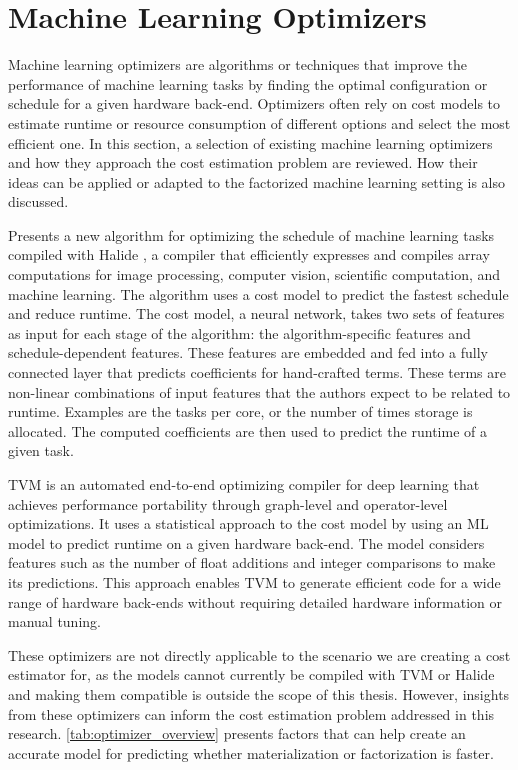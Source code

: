 \section{Machine Learning Optimizers}
\label{sec:3-ml-optimizers}
Machine learning optimizers are algorithms or techniques that improve the performance of machine learning tasks by finding the optimal configuration or schedule for a given hardware back-end. Optimizers often rely on cost models to estimate runtime or resource consumption of different options and select the most efficient one. In this section, a selection of existing machine learning optimizers and how they approach the cost estimation problem are reviewed. How their ideas can be applied or adapted to the factorized machine learning setting is also discussed.

\cite{halide_cost_model} Presents a new algorithm for optimizing the schedule of machine learning tasks compiled with Halide \cite{halide_cost_model}, a compiler that efficiently expresses and compiles array computations for image processing, computer vision, scientific computation, and machine learning. The algorithm uses a cost model to predict the fastest schedule and reduce runtime. The cost model, a neural network, takes two sets of features as input for each stage of the algorithm: the algorithm-specific features and schedule-dependent features. These features are embedded and fed into a fully connected layer that predicts coefficients for hand-crafted terms. These terms are non-linear combinations of input features that the authors expect to be related to runtime. Examples are the tasks per core, or the number of times storage is allocated. The computed coefficients are then used to predict the runtime of a given task.

TVM \cite{tvm} is an automated end-to-end optimizing compiler for deep learning that achieves performance portability through graph-level and operator-level optimizations. It uses a statistical approach to the cost model by using an ML model to predict runtime on a given hardware back-end. The model considers features such as the number of float additions and integer comparisons to make its predictions. This approach enables TVM to generate efficient code for a wide range of hardware back-ends without requiring detailed hardware information or manual tuning.

These optimizers are not directly applicable to the scenario we are creating a cost estimator for, as the models cannot currently be compiled with TVM or Halide and making them compatible is outside the scope of this thesis. However, insights from these optimizers can inform the cost estimation problem addressed in this research. \autoref{tab:optimizer_overview} presents factors that can help create an accurate model for predicting whether materialization or factorization is faster.

